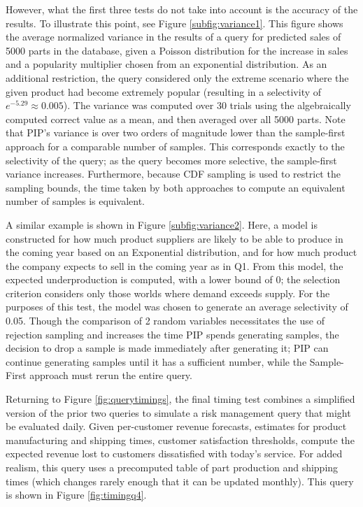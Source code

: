 However, what the first three tests do not take into account is the accuracy of the results.  To illustrate this point, see Figure \ref{subfig:variance1}.  This figure shows the average normalized variance in the results of a query for predicted sales of 5000 parts in the database, given a Poisson distribution for the increase in sales and a popularity multiplier chosen from an exponential distribution.  As an additional restriction, the query considered only the extreme scenario where the given product had become extremely popular (resulting in a selectivity of $e^{-5.29} \approx 0.005$).  The variance was computed over 30 trials using the algebraically computed correct value as a mean, and then averaged over all 5000 parts.  Note that PIP's variance is over two orders of magnitude lower than the sample-first approach for a comparable number of samples.  This corresponds exactly to the selectivity of the query; as the query becomes more selective, the sample-first variance increases.  Furthermore, because CDF sampling is used to restrict the sampling bounds, the time taken by both approaches to compute an equivalent number of samples is equivalent.

A similar example is shown in Figure \ref{subfig:variance2}.  Here, a model is constructed for how much product suppliers are likely to be able to produce in the coming year based on an Exponential distribution, and for how much product the company expects to sell in the coming year as in Q1.  From this model, the expected underproduction is computed, with a lower bound of 0; the selection criterion considers only those worlds where demand exceeds supply.  For the purposes of this test, the model was chosen to generate an average selectivity of 0.05.  Though the comparison of 2 random variables necessitates the use of rejection sampling and increases the time PIP spends generating samples, the decision to drop a sample is made immediately after generating it; PIP can continue generating samples until it has a sufficient number, while the Sample-First approach must rerun the entire query.

Returning to Figure \ref{fig:querytimings}, the final timing test combines a simplified version of the prior two queries to simulate a risk management query that might be evaluated daily.  Given per-customer revenue forecasts, estimates for product manufacturing and shipping times, customer satisfaction thresholds, compute the expected revenue lost to customers dissatisfied with today's service.  For added realism, this query uses a precomputed table of part production and shipping times (which changes rarely enough that it can be updated monthly).  This query is shown in Figure \ref{fig:timingq4}.

